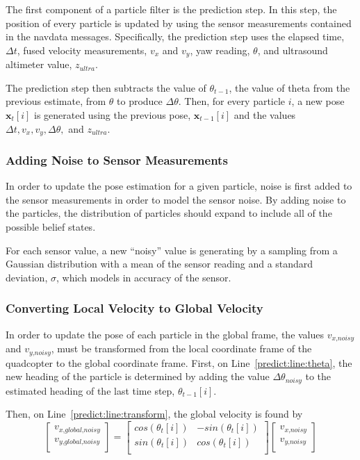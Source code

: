 		The first component of a particle filter is the prediction step. In this step, the position of every particle is updated by using the sensor measurements contained in the navdata messages. Specifically, the prediction step uses the elapsed time, $\Delta t$, fused velocity measurements, $v_x$ and $v_y$, yaw reading, $\theta$, and ultrasound altimeter value, $z_{ultra}$.

		The prediction step then subtracts the value of $\theta_{t-1}$, the value of theta from the previous estimate, from $\theta$ to produce $\Delta\theta$. Then, for every particle $i$, a new pose $\textbf{x}_t[i]$ is generated using the previous pose, $\textbf{x}_{t-1}[i]$ and the values $\Delta t, v_x, v_y, \Delta\theta,$ and $z_{ultra}$.

		\subsubsection{Adding Noise to Sensor Measurements}
			In order to update the pose estimation for a given particle, noise is first added to the sensor measurements in order to model the sensor noise. By adding noise to the particles, the distribution of particles should expand to include all of the possible belief states.


			For each sensor value, a new ``noisy'' value is generating by a sampling from a Gaussian distribution with a mean of the sensor reading and a standard deviation, $\sigma$, which models in accuracy of the sensor. 
		
		\subsubsection{Converting Local Velocity to Global Velocity}
			In order to update the pose of each particle in the global frame, the values $v_{\textit{x,noisy}}$ and $v_{\textit{y,noisy}}$, must be transformed from the local coordinate frame of the quadcopter to the global coordinate frame. First, on Line~\ref{predict:line:theta}, the new heading of the particle is determined by adding the value $\Delta\theta_{\textit{noisy}}$ to the estimated heading of the last time step, $\theta_{t-1}[i]$.

			Then, on Line~\ref{predict:line:transform}, the global velocity is found by
			\[
			\begin{bmatrix} 
			  v_{\textit{x,global,noisy}}\\
			  v_{\textit{y,global,noisy}}\\
			\end{bmatrix}
			=
			\begin{bmatrix} 
			  cos(\theta_t[i]) & -sin(\theta_t[i])\\
			  sin(\theta_t[i]) & cos(\theta_t[i])\\
			\end{bmatrix}
			\begin{bmatrix} 
			  v_{\textit{x,noisy}}\\
			  v_{\textit{y,noisy}}\\
			\end{bmatrix}
			\]

